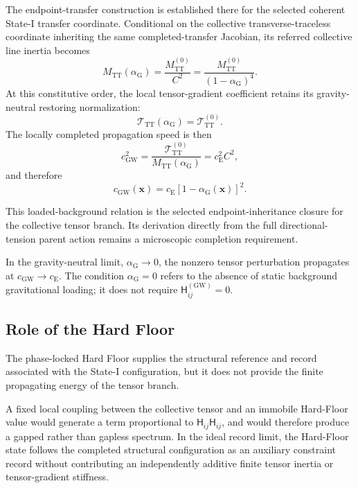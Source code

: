 The endpoint-transfer construction is established there for the selected coherent State-I transfer coordinate. Conditional on the collective transverse-traceless coordinate inheriting the same completed-transfer Jacobian, its referred collective line inertia becomes
\begin{equation}
    M_{\mathrm{TT}}(\alpha_{\mathrm{G}}) = \frac{ M_{\mathrm{TT}}^{(0)} }{ C^{2} } = \frac{ M_{\mathrm{TT}}^{(0)} }{ \left( 1-\alpha_{\mathrm{G}} \right)^{4} }.
\end{equation}
At this constitutive order, the local tensor-gradient coefficient retains its gravity-neutral restoring normalization:
\begin{equation}
    \mathcal{T}_{\mathrm{TT}}(\alpha_{\mathrm{G}}) = \mathcal{T}_{\mathrm{TT}}^{(0)}.
\end{equation}
The locally completed propagation speed is then
\begin{equation}
    c_{\mathrm{GW}}^{2} = \frac{ \mathcal{T}_{\mathrm{TT}}^{(0)} }{ M_{\mathrm{TT}}(\alpha_{\mathrm{G}}) } = c_{\mathrm{E}}^{2}C^{2},
\end{equation}
and therefore
\begin{equation}
    c_{\mathrm{GW}}(\mathbf{x}) = c_{\mathrm{E}} \left[ 1-\alpha_{\mathrm{G}}(\mathbf{x}) \right]^{2}.
\end{equation}

This loaded-background relation is the selected endpoint-inheritance closure for the collective tensor branch. Its derivation directly from the full directional-tension parent action remains a microscopic completion requirement.

In the gravity-neutral limit, $\alpha_{\mathrm{G}}\to 0$, the nonzero tensor perturbation propagates at $c_{\mathrm{GW}}\to c_{\mathrm{E}}$. The condition $\alpha_{\mathrm{G}}=0$ refers to the absence of static background gravitational loading; it does not require $\mathsf{H}_{ij}^{(\mathrm{GW})}=0$.

\subsection{Role of the Hard Floor}
\label{subsec:role_of_hard_floor}

The phase-locked Hard Floor supplies the structural reference and record associated with the State-I configuration, but it does not provide the finite propagating energy of the tensor branch.

A fixed local coupling between the collective tensor and an immobile Hard-Floor value would generate a term proportional to $\mathsf{H}_{ij}\mathsf{H}_{ij}$, and would therefore produce a gapped rather than gapless spectrum. In the ideal record limit, the Hard-Floor state follows the completed structural configuration as an auxiliary constraint record without contributing an independently additive finite tensor inertia or tensor-gradient stiffness.

